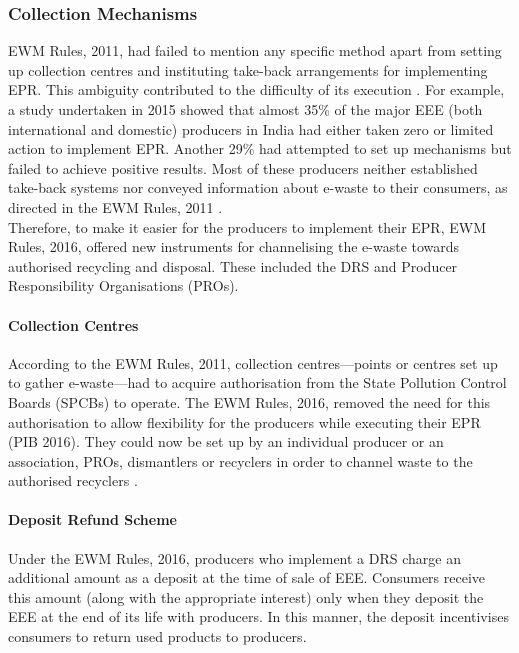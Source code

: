 \documentclass[a4paper, 12pt]{article}
\begin{document}
                    \subsubsection{Collection Mechanisms}
                    
                    EWM Rules, 2011, had failed to mention any specific method apart from setting up collection centres and instituting take-back arrangements for implementing EPR. This ambiguity contributed to the difficulty of its execution \parencite{pibreport}. For example, a study undertaken in 2015 showed that almost 35\% of the major EEE (both international and domestic) producers in India had either taken zero or limited action to implement EPR. Another 29\% had attempted to set up mechanisms but failed to achieve positive results. Most of these producers neither established take-back systems nor conveyed information about e-waste to their consumers, as directed in the EWM Rules, 2011 \parencite{toxicsreportb}. \\
                    
                    Therefore, to make it easier for the producers to implement their EPR, EWM Rules, 2016, offered new instruments for channelising the e-waste towards authorised recycling and disposal. These included the DRS and Producer Responsibility Organisations (PROs).
                    
                    \paragraph{Collection Centres} 
                    
                    According to the EWM Rules, 2011, collection centres—points or centres set up to gather e-waste—had to acquire authorisation from the State Pollution Control Boards (SPCBs) to operate. The EWM Rules, 2016, removed the need for this authorisation to allow flexibility for the producers while executing their EPR (PIB 2016). They could now be set up by an individual producer or an association, PROs, dismantlers or recyclers in order to channel waste to the authorised recyclers \parencite{pibreport}. 
                    
                    \paragraph{Deposit Refund Scheme}
                    
                    Under the EWM Rules, 2016, producers who implement a DRS charge an additional amount as a deposit at the time of sale of EEE. Consumers receive this amount (along with the appropriate interest) only when they deposit the EEE at the end of its life with producers. In this manner, the deposit incentivises consumers to return used products to producers. 
                    
\end{document}
